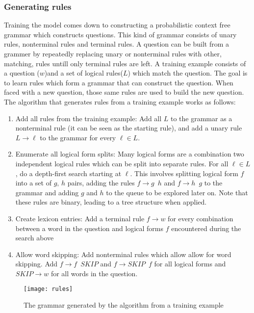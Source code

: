\subsubsection{Generating rules}
Training the model comes down to constructing a probabilistic context free grammar which constructs questions. This kind of grammar consists of unary rules, nonterminal rules and terminal rules. A question can be built from a grammer by repeatedly replacing unary or nonterminal rules with other, matching, rules untill only terminal rules are left. A training example consists of a question ($w$)and a set of logical rules($L$) which match the question. The goal is to learn rules which form a grammar that can construct the question. When faced with a new question, those same rules are used to build the new question. The algorithm that generates rules from a training example works as follows:
\begin{enumerate}
\item Add all rules from the training example: Add all $L$ to the grammar as a nonterminal rule (it can be seen as the starting rule), and add a unary rule $ L \rightarrow \ell $ to the grammar for every $\ell \in L$.
\item Enumerate all logical form splits: Many logical forms are a combination two independent logical rules which can be split into separate rules. For all $\ell \in L$, do a depth-first search starting at $\ell$. This involves splitting logical form $f$ into a set of $g,\, h$ pairs, adding the rules $ f \rightarrow g \enspace h$ and $ f \rightarrow h \enspace g$ to the grammar and adding $g$ and $h$ to the queue to be explored later on. Note that these rules are binary, leading to a tree structure when applied.
\item Create lexicon entries: Add a terminal rule $ f \rightarrow w$ for every combination between a word in the question and logical forms $f$ encountered during the search above
\item Allow word skipping: Add nonterminal rules which allow allow for word skipping. Add $ f \rightarrow f \enspace SKIP$ and $ f \rightarrow SKIP \enspace f$ for all logical forms and $ SKIP \rightarrow w$ for all words in the question.
\end{enumerate}

\begin{figure}[H]
\texttt{[image: rules]}
\caption{The grammar generated by the algorithm from a training example}\label{fig:rules}
\end{figure}


